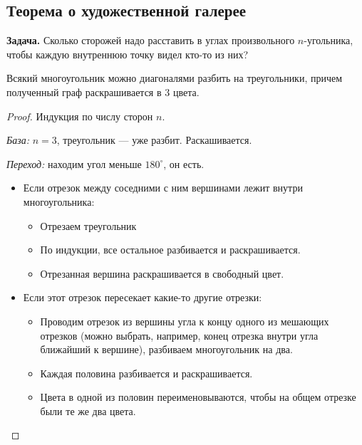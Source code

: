 \subsection{Теорема о художественной галерее}

\textbf{Задача.} Сколько сторожей надо расставить в углах произвольного $n$-угольника, чтобы каждую внутреннюю точку видел кто-то из них?

\begin{lemma}
    \label{lem:treang}
    Всякий многоугольник можно диагоналями разбить на треугольники, причем полученный граф раскрашивается в $3$ цвета.
\end{lemma}

\begin{proof}
    
    Индукция по числу сторон $n$.

    \textsl{База:} $n = 3$, треугольник --- уже разбит. Раскашивается.

    \textsl{Переход:} находим угол меньше $180^\circ$, он есть.

    \begin{itemize}
        \item Если отрезок между соседними с ним вершинами лежит внутри многоугольника:
        \begin{itemize}
            \item Отрезаем треугольник
            \item По индукции, все остальное разбивается и раскрашивается.
            \item Отрезанная вершина раскрашивается в свободный цвет.
        \end{itemize}

        \item Если этот отрезок пересекает какие-то другие отрезки:
        \begin{itemize}
            \item Проводим отрезок из вершины угла к концу одного из мешающих отрезков (можно выбрать, например, конец отрезка внутри угла ближайший к вершине), разбиваем многоугольник на два.
            \item Каждая половина разбивается и раскрашивается.
            \item Цвета в одной из половин переименовываются, чтобы на общем отрезке были те же два цвета.
        \end{itemize}
    \end{itemize}
\end{proof}

